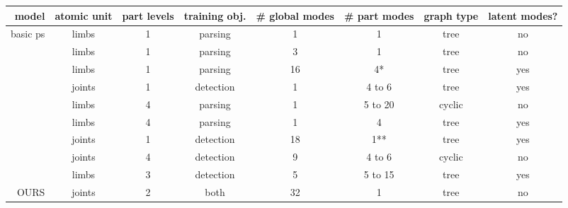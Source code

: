 \begin{tabular}{| r | c | c |c | c | c | c | c |}
\hline
model &	atomic unit & part levels & training obj. & \# global modes	& \# part modes	& graph type & latent modes?	\\
\hline
basic ps	& limbs	& 1 &	parsing	& 1	& 1	& tree & no \\
\cite{wang2008multiple} & limbs & 1 &	parsing &	3	& 1	& tree &	no \\
\cite{everingham2011} &	limbs &	1 &	parsing &	16 & 4* &	tree &	yes \\
\cite{deva2011} &	joints & 1	& detection &	1 &	4 to 6 & tree	& yes \\
\cite{wang2011} & limbs & 4	& parsing	& 1 &	5 to 20 & cyclic & no \\
\cite{sun2011} & limbs	& 4	&	parsing	& 1	& 4	& tree & yes \\
\cite{ramanan-faces} &	joints &	1	& detection &	18	& 1** &	tree	& yes \\
\cite{batra2012} & joints	& 4	&	detection &	9 &	4 to 6 & cyclic &	no \\
\cite{tianexploring} & limbs & 3 & detection	& 5 &	5 to 15 &	tree & yes \\
\hline
OURS & joints & 2 & both & 32 & 1 & tree & no \\
\hline
\end{tabular}


